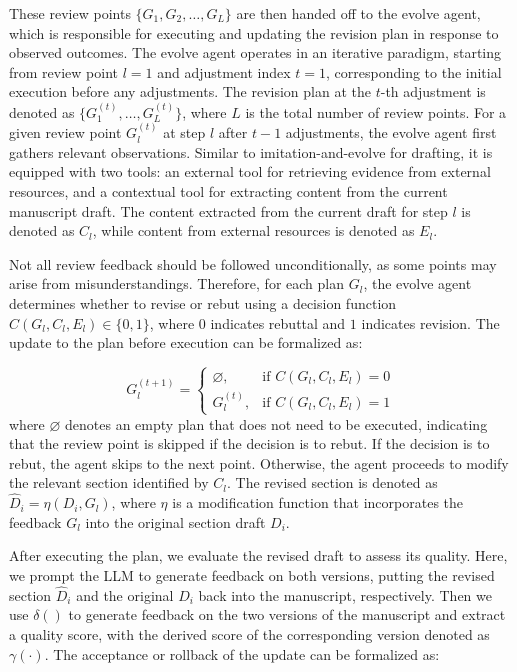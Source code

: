 \documentclass[manuscript,review,anonymous]{acmart}
\begin{document}
These review points $\{G_1, G_2, \ldots, G_L\}$ are then handed off to the evolve agent, which is responsible for executing and updating the revision plan in response to observed outcomes. The evolve agent operates in an iterative paradigm, starting from review point $l = 1$ and adjustment index $t = 1$, corresponding to the initial execution before any adjustments. The revision plan at the $t$-th adjustment is denoted as $\{G_1^{(t)}, \ldots, G_L^{(t)}\}$, where $L$ is the total number of review points. For a given review point $G_l^{(t)}$ at step $l$ after $t-1$ adjustments, the evolve agent first gathers relevant observations. Similar to imitation-and-evolve for drafting, it is equipped with two tools: an external tool for retrieving evidence from external resources, and a contextual tool for extracting content from the current manuscript draft. The content extracted from the current draft for step $l$ is denoted as $C_l$, while content from external resources is denoted as $E_l$.

Not all review feedback should be followed unconditionally, as some points may arise from misunderstandings. Therefore, for each plan $G_l$, the evolve agent determines whether to revise or rebut using a decision function $C(G_l, C_l, E_l) \in \{0, 1\}$, where $0$ indicates rebuttal and $1$ indicates revision. The update to the plan before execution can be formalized as:

\begin{equation}
  G_l^{(t+1)} =
  \begin{cases}
    \varnothing, & \text{if } C(G_l, C_l, E_l) = 0 \\
    G_l^{(t)}, & \text{if } C(G_l, C_l, E_l) = 1
  \end{cases}
\end{equation}
where $\varnothing$ denotes an empty plan that does not need to be executed, indicating that the review point is skipped if the decision is to rebut. If the decision is to rebut, the agent skips to the next point. Otherwise, the agent proceeds to modify the relevant section identified by $C_l$. The revised section is denoted as $\hat{D}_i = \eta(D_i, G_l)$, where $\eta$ is a modification function that incorporates the feedback $G_l$ into the original section draft $D_i$.

After executing the plan, we evaluate the revised draft to assess its quality. Here, we prompt the LLM to generate feedback on both versions, putting the revised section $\hat{D}_i$ and the original $D_i$ back into the manuscript, respectively. Then we use $\delta()$ to generate feedback on the two versions of the manuscript and extract a quality score, with the derived score of the corresponding version denoted as $\gamma(\cdot)$. The acceptance or rollback of the update can be formalized as:
\end{document}
